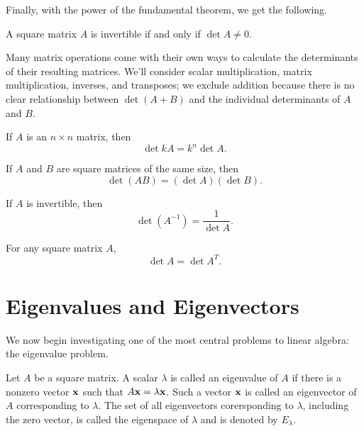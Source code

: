 \documentclass[../m073main.tex]{subfiles}
\begin{document}
Finally, with the power of the fundamental theorem, we get the following.

\begin{theorem}
	A square matrix $A$ is invertible if and only if $\det A \neq 0$.
\end{theorem}

Many matrix operations come with their own ways to calculate the determinants of their resulting matrices.
We'll consider scalar multiplication, matrix multiplication, inverses, and transposes; we exclude addition because there is no clear relationship between $\det (A + B)$ and the individual determinants of $A$ and $B$.

\begin{theorem}
	If $A$ is an $n \times n$ matrix, then
	\[ \det kA = k^n \det A. \]
\end{theorem}

\begin{theorem}
	If $A$ and $B$ are square matrices of the same size, then
	\[ \det (AB) = (\det A)(\det B). \]
\end{theorem}

\begin{theorem}
	If $A$ is invertible, then
	\[ \det (A^{-1}) = \frac{1}{\det A}. \]
\end{theorem}

\begin{theorem}
	For any square matrix $A$,
	\[ \det A = \det A^T. \]
\end{theorem}

\section{Eigenvalues and Eigenvectors}
We now begin investigating one of the most central problems to linear algebra: the eigenvalue problem.

\begin{definition}
	Let $A$ be a square matrix.
	A scalar $\lambda$ is called an eigenvalue of $A$ if there is a nonzero vector $\mathbf{x}$ such that $A \mathbf{x} = \lambda \mathbf{x}$.
	Such a vector $\mathbf{x}$ is called an eigenvector of $A$ corresponding to $\lambda$.
	The set of all eigenvectors corersponding to $\lambda$, including the zero vector, is called the eigenspace of $\lambda$ and is denoted by $E_\lambda$.
\end{definition}
\end{document}

